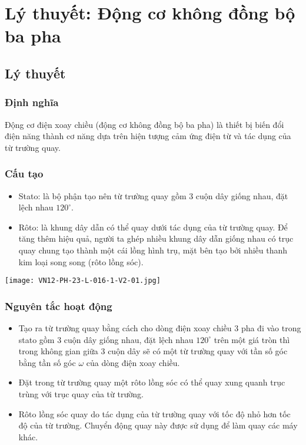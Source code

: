 
\chapter[Lý thuyết: Động cơ không đồng bộ ba pha]{Lý thuyết: Động cơ không đồng bộ ba pha}
\section{Lý thuyết}
\subsection {Định nghĩa}
Động cơ điện xoay chiều (động cơ không đồng bộ ba pha) là thiết bị biến đổi điện năng thành cơ năng dựa trên hiện tượng cảm ứng điện từ và tác dụng của từ trường quay.
\subsection{Cấu tạo}
\begin{itemize}
	\item Stato: là bộ phận tạo nên từ trường quay gồm 3 cuộn dây giống nhau, đặt lệch nhau $120^ {\circ}$.
	\item Rôto: là khung dây dẫn có thể quay dưới tác dụng của từ trường quay. Để tăng thêm hiệu quả, người ta ghép nhiều khung dây dẫn giống nhau có trục quay chung tạo thành một cái lồng hình trụ, mặt bên tạo bởi nhiều thanh kim loại song song (rôto lồng sóc).
\end{itemize}
\begin{center}
	\texttt{[image: VN12-PH-23-L-016-1-V2-01.jpg]}
\end{center}
\subsection {Nguyên tắc hoạt động}
\begin{itemize}
	\item Tạo ra từ trường quay bằng cách cho dòng điện xoay chiều 3 pha đi vào trong stato gồm 3 cuộn dây giống nhau, đặt lệch nhau $120^\circ$ trên một giá tròn thì trong không gian giữa 3 cuộn dây sẽ có một từ trường quay với tần số góc bằng tần số góc $\omega$ của dòng điện xoay chiều.
	\item Đặt trong từ trường quay một rôto lồng sóc có thể quay xung quanh trục trùng với trục quay của từ trường.
	\item Rôto lồng sóc quay do tác dụng của từ trường quay với tốc độ nhỏ hơn tốc độ của từ trường. Chuyển động quay này được sử dụng để làm quay các máy khác.
\end{itemize}


